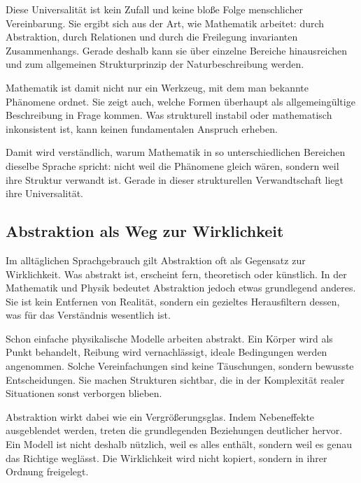 Diese Universalität ist kein Zufall
und keine bloße Folge menschlicher Vereinbarung.
Sie ergibt sich aus der Art,
wie Mathematik arbeitet:
durch Abstraktion,
durch Relationen
und durch die Freilegung invarianten Zusammenhangs.
Gerade deshalb kann sie
über einzelne Bereiche hinausreichen
und zum allgemeinen Strukturprinzip der Naturbeschreibung werden.

Mathematik ist damit nicht nur ein Werkzeug,
mit dem man bekannte Phänomene ordnet.
Sie zeigt auch,
welche Formen überhaupt als allgemeingültige Beschreibung in Frage kommen.
Was strukturell instabil oder mathematisch inkonsistent ist,
kann keinen fundamentalen Anspruch erheben.

Damit wird verständlich,
warum Mathematik in so unterschiedlichen Bereichen
dieselbe Sprache spricht:
nicht weil die Phänomene gleich wären,
sondern weil ihre Struktur verwandt ist.
Gerade in dieser strukturellen Verwandtschaft
liegt ihre Universalität.




\subsection{Abstraktion als Weg zur Wirklichkeit}

Im alltäglichen Sprachgebrauch
gilt Abstraktion
oft als Gegensatz zur Wirklichkeit.
Was abstrakt ist,
erscheint fern,
theoretisch
oder künstlich.
In der Mathematik
und Physik
bedeutet Abstraktion jedoch etwas grundlegend anderes.
Sie ist kein Entfernen von Realität,
sondern ein gezieltes Herausfiltern dessen,
was für das Verständnis wesentlich ist.

Schon einfache physikalische Modelle
arbeiten abstrakt.
Ein Körper wird als Punkt behandelt,
Reibung wird vernachlässigt,
ideale Bedingungen werden angenommen.
Solche Vereinfachungen sind keine Täuschungen,
sondern bewusste Entscheidungen.
Sie machen Strukturen sichtbar,
die in der Komplexität realer Situationen
sonst verborgen blieben.

Abstraktion wirkt dabei wie ein Vergrößerungsglas.
Indem Nebeneffekte ausgeblendet werden,
treten die grundlegenden Beziehungen deutlicher hervor.
Ein Modell ist nicht deshalb nützlich,
weil es alles enthält,
sondern weil es genau das Richtige weglässt.
Die Wirklichkeit wird nicht kopiert,
sondern in ihrer Ordnung freigelegt.

